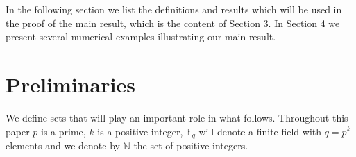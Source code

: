 \documentclass[12pt]{article}
\newcommand{\F}{\mathbb{F}}
\begin{document}
In the following section we list the definitions and results which will be used 
in the proof of the main result, which is the content of Section 3. In Section 
4 we 
present several numerical examples  illustrating our main result.


\section{Preliminaries}



 We define sets that will play an important  role in what 
follows.
Throughout this paper $p$ is a prime, $k$ is a positive integer, 
$\mathbb{F}_q$ will denote a finite field with $q=p^k$ elements and we denote
by $\mathbb{N}$ the set of positive integers.
\end{document}
